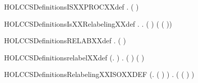 \newcommand{\HOLCCSDefinitionsFVXXdef}{\UseVerbatim{HOLCCSDefinitionsFVXXdef}}
\begin{SaveVerbatim}{HOLCCSDefinitionsISXXPROCXXdef}
\HOLTokenTurnstile{} \HOLSymConst{\HOLTokenForall{}}.   \HOLSymConst{\HOLTokenEquiv{}} (  \HOLSymConst{=} \HOLTokenLeftbrace{}\HOLTokenRightbrace{})
\end{SaveVerbatim}
\newcommand{\HOLCCSDefinitionsISXXPROCXXdef}{\UseVerbatim{HOLCCSDefinitionsISXXPROCXXdef}}
\begin{SaveVerbatim}{HOLCCSDefinitionsIsXXRelabelingXXdef}
\HOLTokenTurnstile{} \HOLSymConst{\HOLTokenForall{}}.   \HOLSymConst{\HOLTokenEquiv{}} \HOLSymConst{\HOLTokenForall{}}.  ( ) \HOLSymConst{=}  ( ( ))
\end{SaveVerbatim}
\newcommand{\HOLCCSDefinitionsIsXXRelabelingXXdef}{\UseVerbatim{HOLCCSDefinitionsIsXXRelabelingXXdef}}
\begin{SaveVerbatim}{HOLCCSDefinitionsRELABXXdef}
\HOLTokenTurnstile{} \HOLSymConst{\HOLTokenForall{}}.   \HOLSymConst{=}  ( )
\end{SaveVerbatim}
\newcommand{\HOLCCSDefinitionsRELABXXdef}{\UseVerbatim{HOLCCSDefinitionsRELABXXdef}}
\begin{SaveVerbatim}{HOLCCSDefinitionsrelabelXXdef}
\HOLTokenTurnstile{} (\HOLSymConst{\HOLTokenForall{}}.   \HOLConst{\ensuremath{\tau}} \HOLSymConst{=} \HOLConst{\ensuremath{\tau}}) \HOLSymConst{\HOLTokenConj{}}
   \HOLSymConst{\HOLTokenForall{}} .   ( ) \HOLSymConst{=}  (  )
\end{SaveVerbatim}
\newcommand{\HOLCCSDefinitionsrelabelXXdef}{\UseVerbatim{HOLCCSDefinitionsrelabelXXdef}}
\begin{SaveVerbatim}{HOLCCSDefinitionsRelabelingXXISOXXDEF}
\HOLTokenTurnstile{} (\HOLSymConst{\HOLTokenForall{}}.  ( ) \HOLSymConst{=} ) \HOLSymConst{\HOLTokenConj{}}
   \HOLSymConst{\HOLTokenForall{}}.
         \HOLSymConst{\HOLTokenEquiv{}}
       ( ( ) \HOLSymConst{=} )
\end{SaveVerbatim}
